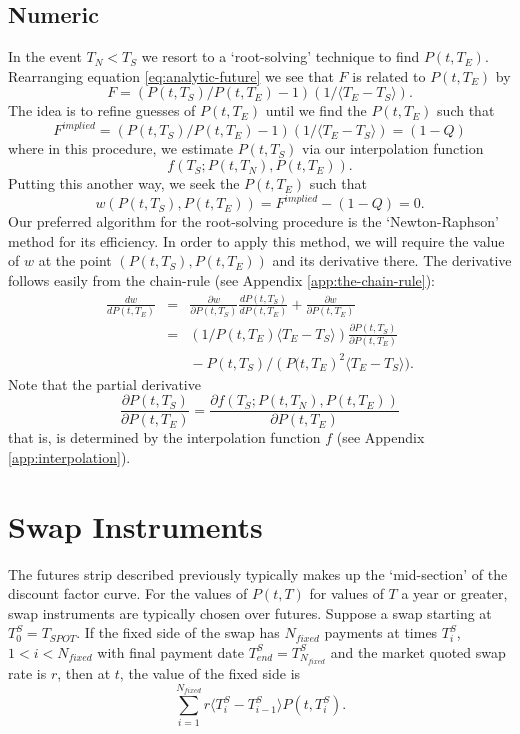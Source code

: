 \documentclass[a4paper]{article}
\begin{document}
\subsection{Numeric}
In the event $T_{N} < T_{S}$ we resort to a `root-solving' technique to find $P(t, T_{E})$. Rearranging equation \ref{eq:analytic-future} we see that $F$ is related to $P(t, T_{E})$ by
\[
  F = (P(t, T_{S}) / P(t, T_{E}) - 1)\left(1 / \langle T_{E} - T_{S}\rangle \right).
\] The idea is to refine guesses of $P(t, T_{E})$ until we find the $P(t, T_{E})$ such that
\[
  F^{implied} = \left(P(t, T_{S}) / P(t, T_{E}) - 1\right)\left(1 / \langle T_{E} - T_{S}\rangle\right) = (1 - Q)
\] where in this procedure, we estimate $P(t, T_{S})$ via our interpolation function \[f\left(T_{S}; P(t, T_{N}), P(t, T_{E})\right).\] Putting this another way, we seek the $P(t, T_{E})$ such that 
\begin{equation}
  w\left(P(t, T_{S}), P(t, T_{E})\right) = F^{implied} - (1 - Q) = 0.
\end{equation}
Our preferred algorithm for the root-solving procedure is the `Newton-Raphson' method for its efficiency. In order to apply this method, we will require the value of $w$ at the point $(P(t, T_{S}), P(t, T_{E}))$ and its derivative there. The derivative follows easily from the chain-rule (see Appendix \ref{app:the-chain-rule}):
\begin{eqnarray}
  \frac{dw}{dP(t, T_{E})} 
  & = &\frac{\partial{w}}{\partial{P(t, T_{S})}}\frac{dP(t, T_{S})}{dP(t, T_{E})} + \frac{\partial{w}}{\partial{P(t, T_{E})}} \nonumber \\
  & = & \left(1/P(t,T_{E})\langle T_{E}-T_{S}\rangle\right)\frac{\partial{P(t,T_{S})}}{\partial{P(t,T_{E})}} \nonumber \\
  &   & \mbox{} - P(t,T_{S})/\left(P(t,T_{E}\right)^{2}\langle T_{E}-T_{S}\rangle).
\end{eqnarray} Note that the partial derivative 
\[
 \frac{\partial{P(t,T_{S})}}{\partial{P(t,T_{E})}} = \frac{\partial{f(T_{S}; P(t, T_{N}), P(t, T_{E}))}}{\partial{P(t,T_{E})}}
\] that is, is determined by the interpolation function $f$ (see Appendix \ref{app:interpolation}).

\section{Swap Instruments} \label{sec:swap-instruments}

The futures strip described previously typically makes up the `mid-section' of the discount factor curve. For the values of $P(t, T)$ for values of $T$ a year or greater, swap instruments are typically chosen over futures. Suppose a swap starting at $T^{S}_{0} = T_{SPOT}$. If the fixed side of the swap has $N_{fixed}$ payments at times $T^{S}_{i}$, $1 < i < N_{fixed}$ with final payment date $T^{S}_{end} = T^{S}_{N_{fixed}}$ and the market quoted swap rate is $r$, then at $t$, the value of the fixed side is
\begin{equation}
  \sum_{i=1}^{N_{fixed}}r\langle T^{S}_{i}-T^{S}_{i-1}\rangle P(t, T^{S}_{i}). \label{eq:swap-fixed-side-value} 
\end{equation}
\end{document}
